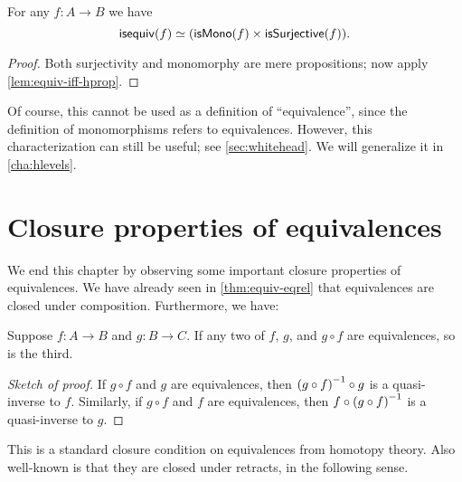 \begin{cor}
  For any $f:A\to B$ we have
  \[ \mathsf{isequiv}(f) \simeq (\mathsf{isMono}(f) \times \mathsf{isSurjective}(f)).\]
\end{cor}
\begin{proof}
  Both surjectivity and monomorphy are mere propositions; now apply \autoref{lem:equiv-iff-hprop}.
\end{proof}

Of course, this cannot be used as a definition of ``equivalence'', since the definition of monomorphisms refers to equivalences.
However, this characterization can still be useful; see \autoref{sec:whitehead}.
We will generalize it in \autoref{cha:hlevels}.


\section{Closure properties of equivalences}
\label{sec:equiv-closures}
\label{sec:fiberwise-equivalences}

We end this chapter by observing some important closure properties of equivalences.
We have already seen in \autoref{thm:equiv-eqrel} that equivalences are closed under composition.
Furthermore, we have:

\begin{thm}\label{thm:two-out-of-three}
  Suppose $f:A\to B$ and $g:B\to C$.
  If any two of $f$, $g$, and $g\circ f$ are equivalences, so is the third.
\end{thm}
\begin{proof}[Sketch of proof]
  If $g\circ f$ and $g$ are equivalences, then $\mathord{{(g\circ f)}^{-1}} \circ g$ is a quasi-inverse to $f$.
  Similarly, if $g\circ f$ and $f$ are equivalences, then $f\circ \mathord{{(g\circ f)}^{-1}}$ is a quasi-inverse to $g$.
\end{proof}

This is a standard closure condition on equivalences from homotopy theory.
Also well-known is that they are closed under retracts, in the following sense.

